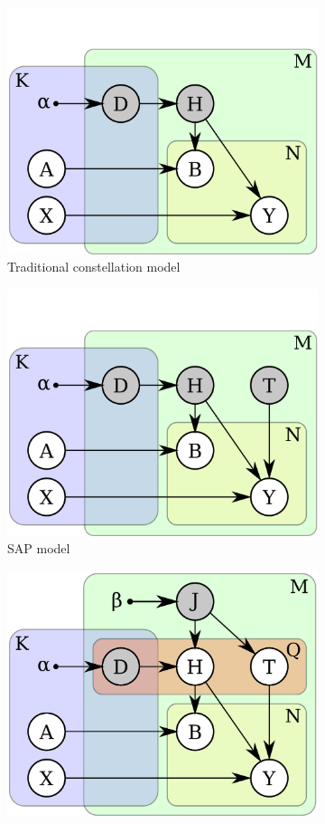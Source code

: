 \begin{figure}[ht]
\centering
\begin{subfigure}[t]{0.48\linewidth}
	\includegraphics[width=0.8\linewidth]{fig/reg/graphicalModelNoPose.pdf}
	\caption{Traditional constellation model}	
	\label{fig/reg/graphicalModelNoPose}
\end{subfigure}  
\begin{subfigure}[t]{0.48\linewidth}
	\includegraphics[width=0.8\linewidth]{fig/reg/graphicalModelNoParticle.pdf}
	\caption{SAP model}	
	\label{fig/reg/graphicalModelNoParticle}
\end{subfigure}
\begin{subfigure}[t]{0.48\linewidth}
	\includegraphics[width=0.8\linewidth]{fig/reg/graphicalModelParticle.pdf}

\end{subfigure}
\end{figure}
